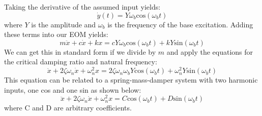 \documentclass[12pt,letter]{article}
\numberwithin{ex}{section} %
\numberwithin{re}{section} %
\numberwithin{vcs}{section} %
\begin{document}
			Taking the derivative of the assumed input yields:
			\begin{equation}
			\dot{y}(t) = Y \omega_b \text{cos}(\omega_b t)
			\end{equation}
			where $Y$ is the amplitude and $\omega_b$ is the frequency of the base excitation. Adding these terms into our EOM yields:
			\begin{equation}
			m\ddot{x} + c\dot{x} + kx = c Y \omega_b \text{cos}(\omega_b t)  + k Y\text{sin}(\omega_b t)  
			\end{equation}
			We can get this in standard form if we divide by $m$ and apply the equations for the critical damping ratio and natural frequency:
			\begin{equation}
			\ddot{x} + 2 \zeta \omega_n \dot{x} + \omega_n^2x = 2 \zeta \omega_n \omega_b Y \text{cos}(\omega_b t)  + \omega_n^2 Y\text{sin}(\omega_b t)
			\label{eq:standard_form_base_excitation}  
			\end{equation}
			This equation can be related to a spring-mass-damper system with two harmonic inputs, one cos and one sin as shown below:
			\begin{equation}
			\ddot{x} + 2 \zeta \omega_n \dot{x} + \omega_n^2x = C \text{cos}(\omega_b t)  + D \text{sin}(\omega_b t)  
			\label{eq:standard_form_base_excitation_CD}
			\end{equation}
			where C and D are arbitrary coefficients. 
\end{document}
